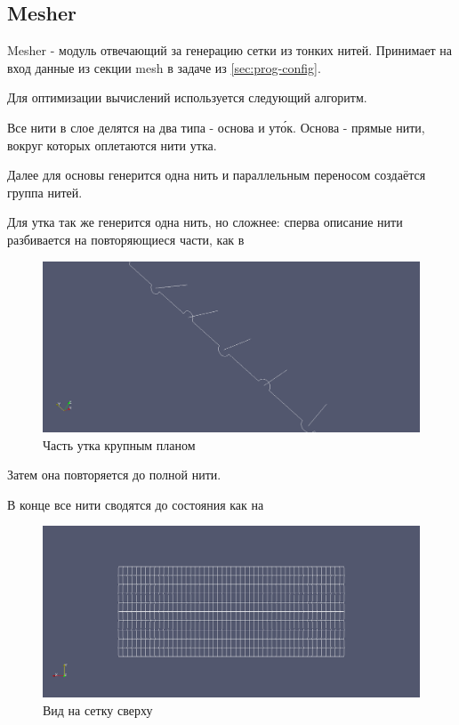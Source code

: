 \subsection{Mesher}\label{sec:prog-mesher}
Mesher - модуль отвечающий за генерацию сетки из тонких нитей.
Принимает на вход данные из секции mesh в задаче из \ref{sec:prog-config}.

Для оптимизации вычислений используется следующий алгоритм.

Все нити в слое делятся на два типа - основа и ут\'{о}к. Основа - прямые нити, вокруг которых оплетаются нити утка.

Далее для основы генерится одна нить и параллельным переносом создаётся группа нитей.

Для утка так же генерится одна нить, но сложнее: сперва описание нити разбивается на повторяющиеся части, как в

\begin{figure}[H]
    \centering
    \label{fig:weft-fiber}
    \includegraphics[width=1.0\textwidth]{img/weft_fiber.png}
    \caption{Часть утка крупным планом}
\end{figure}

Затем она повторяется до полной нити.

В конце все нити сводятся до состояния как на 
\begin{figure}[H]
    \centering
    \label{fig:scheme}
    \includegraphics[width=1.0\textwidth]{img/scheme.png}
    \caption{Вид на сетку сверху}
\end{figure}

